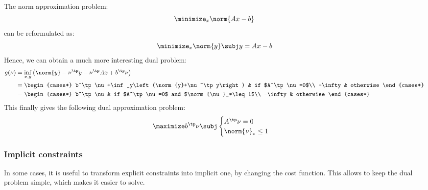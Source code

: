 \begin{example}
    The norm approximation problem:
    \begin{equation*}
        \minimize_x \norm{Ax-b}
    \end{equation*}
    can be reformulated as:
    \begin{equation*}
        \minimize_x \norm{y} \subj y=Ax-b
    \end{equation*}
    Hence, we can obtain a much more interesting dual problem:
    \begin{align*}
        g(\nu) &= \inf_{x,y} \left(\norm{y}-\nu^\tp y-\nu^\tp Ax+b^\tp\nu\right)\\
        &= \begin{cases*}
            b^\tp\nu+\inf_y\left(\norm{y}+\nu^\tp y\right) & if $A^\tp\nu=0$\\
            -\infty & otherwise
        \end{cases*}\\
        &= \begin{cases*}
            b^\tp\nu & if $A^\tp\nu=0$ and $\norm{\nu}_*\leq1$\\
            -\infty & otherwise
        \end{cases*}
    \end{align*}
    This finally gives the following dual approximation problem:
    \begin{equation*}
        \maximize b^\tp\nu \subj \begin{cases}
            A^\tp\nu=0\\
            \norm{\nu}_*\leq1
        \end{cases}
    \end{equation*}
\end{example}

\subsubsection{Implicit constraints}
In some cases, it is useful to transform explicit constraints into implicit one, by changing the cost function. This allows to keep the dual problem simple, which makes it easier to solve.

